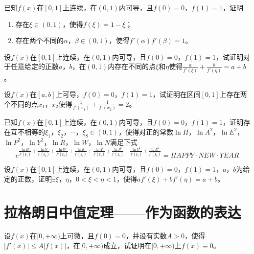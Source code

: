 \begin{example}
	\color{red}已知$f(x)$在$[0,1]$上连续，在$(0,1)$内可导，且$f(0)=0$，$f(1)=1$，证明
	\begin{enumerate}
		\item 存在$\xi\in(0,1)$，使得$f(\xi)=1-\xi$\color{black}；
		\color{red}\item 存在两个不同的$\alpha$，$\beta\in(0,1)$，使得$f'(\alpha)f'(\beta)=1$\color{black}。
	\end{enumerate}
\end{example}

\begin{example}
	\color{red}设$f(x)$在$[0,1]$上连续，在$(0,1)$内可导，且$f(0)=0$，$f(1)=1$，试证明对于任意给定的正数$a$，$b$，在$(0,1)$内存在不同的点$\xi$和$\eta$使得$\frac{a}{f'(\xi)}+\frac{b}{f'(\eta)}=a+b$\color{black}。
\end{example}

\begin{example}
	设$f(x)$在$[a,b]$上可导，$f(0)=0$，$f(1)=1$，试证明在区间$[0,1]$上存在两个不同的点$x_1$，$x_2$使得$\frac{1}{f'(x_1)}+\frac{1}{f'(x_2)}=2$。
\end{example}

\begin{example}
	已知$f(x)$在$[0,1]$上连续，在$(0,1)$内可导，且$f(0)=0$，$f(1)=1$，证明存在互不相等的$\xi_1$，$\xi_2$，$\cdots$，$\xi_8\in(0,1)$，使得对正的常数$\ln H$，$\ln A^2$，$\ln E^2$，$\ln P^2$，$\ln Y^2$，$\ln R$，$\ln W$，$\ln N$满足下式\[e^{\frac{\ln H}{f'(\xi_1)}+\frac{\ln N}{f'(\xi_2)}+\frac{\ln W}{f'(\xi_3)}+\frac{\ln R}{f'(\xi_4)}+\frac{\ln A^2}{f'(\xi_5)}+\frac{\ln P^2}{f'(\xi_6)}+\frac{\ln Y^2}{f'(\xi_7)}+\frac{\ln E^2}{f'(\xi_8)}}=HAPPY\cdot NEW\cdot YEAR\]
\end{example}

\begin{example}
	设$f(x)$在$[0,1]$上连续，在$(0,1)$内可导，且$f(0)=0$，$f(1)=1$，$a$，$b$为给定的正数，证明$\exists\xi$，$\eta$，$0<\xi<\eta<1$，使得$af'(\xi)+bf'(\eta)=a+b$。
\end{example}

\section{拉格朗日中值定理——作为函数的表达}

\begin{example}
	设$f(x)$在$[0,+\infty)$上可微，且$f(0)=0$，并设有实数$A>0$，使得$|f'(x)|\leqslant A|f(x)|$，在$[0,+\infty)$成立，试证明在$[0,+\infty)$上$f(x)\equiv 0$。
\end{example}

